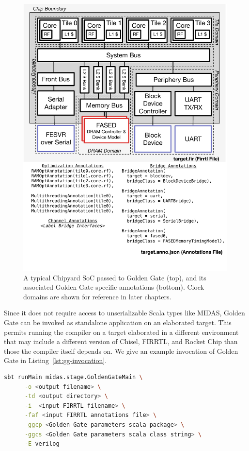 \begin{figure}
    \centering
    \includegraphics[width=0.99\textwidth]{figures/gg-target.pdf}
    \caption{A typical Chipyard SoC passed to Golden Gate (top), and its associated Golden Gate specific
    annotations (bottom). Clock domains are shown for reference in later chapters.}
    \label{fig:gg-target}
\end{figure}

Since it does not require access to unserializable Scala
types like MIDAS, Golden Gate can be invoked as standalone application on an
elaborated target. This permits running the
compiler on a target elaborated in a different environment that may include a
different version of Chisel, FIRRTL, and Rocket Chip than those the compiler
itself depends on. We give an example invocation of Golden Gate in Listing~\ref{lst:gg-invocation}.

\begin{lstlisting}[style=shell, language=bash, label={lst:gg-invocation}, caption=An example command-line invocation of Golden Gate.]
  sbt runMain midas.stage.GoldenGateMain \
      -o <output filename> \
      -td <output directory> \
      -i  <input FIRRTL filename> \
      -faf <input FIRRTL annotations file> \
      -ggcp <Golden Gate parameters scala package> \
      -ggcs <Golden Gate parameters scala class string> \
      -E verilog
\end{lstlisting}

